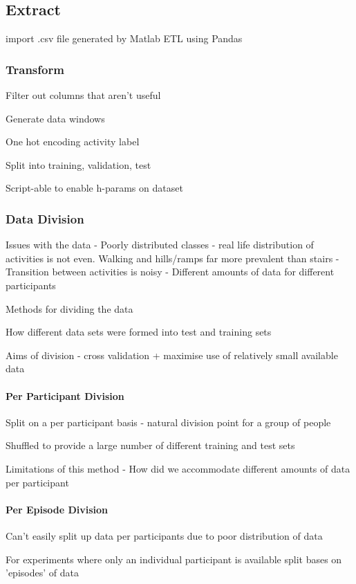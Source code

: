 \subsection{Extract}
import .csv file generated by Matlab ETL using Pandas

\subsubsection{Transform}
Filter out columns that aren't useful

Generate data windows

One hot encoding activity label

Split into training, validation, test

Script-able to enable h-params on dataset

\subsubsection{Data Division}
Issues with the data
    - Poorly distributed classes - real life distribution of activities is not even. Walking and hills/ramps far more prevalent than stairs
    - Transition between activities is noisy
    - Different amounts of data for different participants

Methods for dividing the data

How different data sets were formed into test and training sets

Aims of division - cross validation + maximise use of relatively small available data

\paragraph{Per Participant Division}
Split on a per participant basis - natural division point for a group of people

Shuffled to provide a large number of different training and test sets

Limitations of this method
 - How did we accommodate different amounts of data per participant

\paragraph{Per Episode Division}
Can't easily split up data per participants due to poor distribution of data

For experiments where only an individual participant is available split bases on 'episodes' of data

